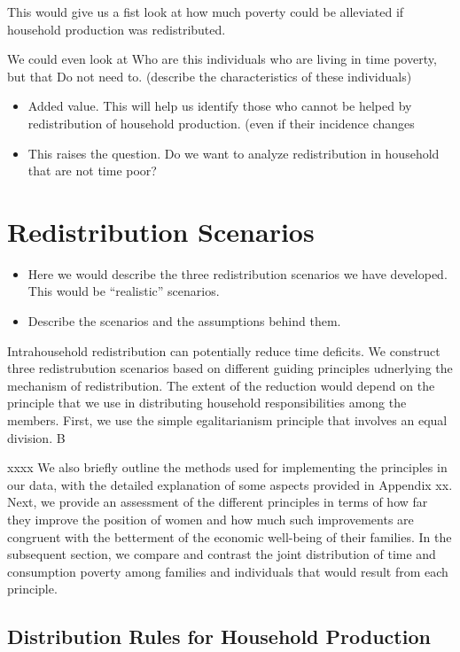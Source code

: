 \documentclass[
  11pt,
]{article}
\begin{document}
This would give us a fist look at how much poverty could be alleviated
if household production was redistributed.

We could even look at Who are this individuals who are living in time
poverty, but that Do not need to. (describe the characteristics of these
individuals)

\begin{itemize}
\item
  Added value. This will help us identify those who cannot be helped by
  redistribution of household production. (even if their incidence
  changes
\item
  This raises the question. Do we want to analyze redistribution in
  household that are not time poor?
\end{itemize}

\section{Redistribution Scenarios}\label{redistribution-scenarios}

\begin{itemize}
\item
  Here we would describe the three redistribution scenarios we have
  developed. This would be ``realistic'' scenarios.
\item
  Describe the scenarios and the assumptions behind them.
\end{itemize}

Intrahousehold redistribution can potentially reduce time deficits. We
construct three redistrubution scenarios based on different guiding
principles udnerlying the mechanism of redistribution. The extent of the
reduction would depend on the principle that we use in distributing
household responsibilities among the members. First, we use the simple
egalitarianism principle that involves an equal division. B

xxxx We also briefly outline the methods used for implementing the
principles in our data, with the detailed explanation of some aspects
provided in Appendix xx. Next, we provide an assessment of the different
principles in terms of how far they improve the position of women and
how much such improvements are congruent with the betterment of the
economic well-being of their families. In the subsequent section, we
compare and contrast the joint distribution of time and consumption
poverty among families and individuals that would result from each
principle.

\subsection{Distribution Rules for Household
Production}\label{distribution-rules-for-household-production}
\end{document}

